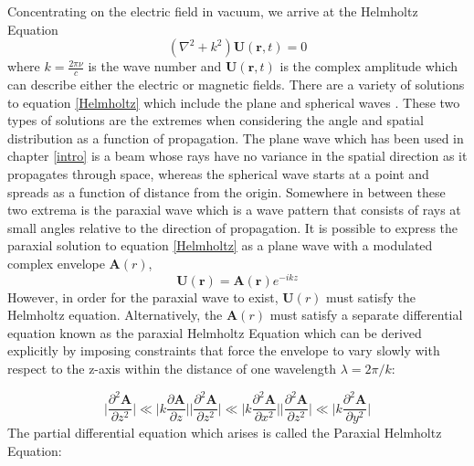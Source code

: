 		Concentrating on the electric field in vacuum, we arrive at the Helmholtz Equation
		\begin{equation}\label{Helmholtz}
		(\nabla^2 + k^2 ) \mathbf{U}(\mathbf{r},t) = 0
		\end{equation}
		where $k=\frac{2\pi\nu}{c}$ is the wave number and $\mathbf{U}(\mathbf{r},t)$ is the complex amplitude which can describe either the electric or magnetic fields.  There are a variety of solutions to equation \ref{Helmholtz} which include the plane and spherical waves \cite{Saleh}.  These two types of solutions are the extremes when considering the angle and spatial distribution as a function of propagation.  The plane wave which has been used in chapter \ref{intro} is a beam whose rays have no variance in the spatial direction as it propagates through space, whereas the spherical wave starts at a point and spreads as a function of distance from the origin. Somewhere in between these two extrema is the paraxial wave which is a wave pattern that consists of rays at small angles relative to the direction of propagation.  It is possible to express the paraxial solution to equation \ref{Helmholtz} as a plane wave with a modulated complex envelope $\mathbf{A}(r)$,
		\begin{equation}
		\mathbf{U}(\mathbf{r}) = \mathbf{A}(\mathbf{r}) e^{-ikz}
		\end{equation}
		However, in order for the paraxial wave to exist, $\mathbf{U}(r)$ must satisfy the Helmholtz equation. Alternatively, the $\mathbf{A}(r)$ must satisfy a separate differential equation known as the paraxial Helmholtz Equation which can be derived explicitly by imposing constraints that force the envelope to vary slowly with respect to the z-axis within the distance of one wavelength $\lambda = 2\pi/k$:

		\begin{subequations}
		\begin{equation}\label{paraxiala}
		\bigg| { \frac{\partial^2 \mathbf{A}}{\partial z^2} } \bigg|  \ll  \bigg| { k {\frac{\partial\mathbf{A}}{{\partial z}} } } \bigg|
		\end{equation}
		\begin{equation}\label{paraxialb}
		\bigg| { \frac{\partial^2 \mathbf{A}}{\partial z^2} } \bigg|  \ll  \bigg| { k {\frac{\partial^2 \mathbf{A}}{\partial x^2}} } \bigg|
		\end{equation}
		\begin{equation}\label{paraxialc}
		\bigg| { \frac{\partial^2 \mathbf{A}}{\partial z^2} } \bigg|  \ll  \bigg| { k{\frac{\partial^2 \mathbf{A}}{\partial y^2}}} \bigg|
		\end{equation}
		\end{subequations}
		The partial differential equation which arises is called the Paraxial Helmholtz Equation:
		
